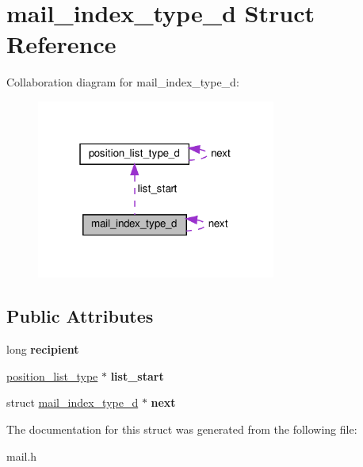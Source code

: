 \hypertarget{structmail__index__type__d}{}\section{mail\+\_\+index\+\_\+type\+\_\+d Struct Reference}
\label{structmail__index__type__d}


Collaboration diagram for mail\+\_\+index\+\_\+type\+\_\+d\+:\nopagebreak
\begin{figure}[H]
\begin{center}
\leavevmode
\includegraphics[width=223pt]{structmail__index__type__d__coll__graph}
\end{center}
\end{figure}
\subsection*{Public Attributes}
\begin{DoxyCompactItemize}
\item 
\mbox{\label{structmail__index__type__d_a411fe473fdf97a11361407dafaa76250}} 
long {\bfseries recipient}
\item 
\mbox{\label{structmail__index__type__d_abba24aaabddf97b1a9d8da88940d8ba4}} 
\hyperlink{structposition__list__type__d}{position\+\_\+list\+\_\+type} $\ast$ {\bfseries list\+\_\+start}
\item 
\mbox{\label{structmail__index__type__d_a9f1f716ba6d0e33b754cc82284b04b95}} 
struct \hyperlink{structmail__index__type__d}{mail\+\_\+index\+\_\+type\+\_\+d} $\ast$ {\bfseries next}
\end{DoxyCompactItemize}


The documentation for this struct was generated from the following file\+:\begin{DoxyCompactItemize}
\item 
mail.\+h\end{DoxyCompactItemize}
